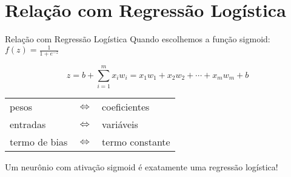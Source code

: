 \documentclass[xcolor=dvipsnames,t,aspectratio=169]{beamer}
\begin{document}
\section{Relação com Regressão Logística}
\begin{frame}[c]{Relação com Regressão Logística}
    Quando escolhemos a função sigmoid: $f(z) = \frac{1}{1 + e^{-z}}$
    
    \begin{equation}
        z = b + \sum_{i=1}^{m} x_i w_i = x_1w_1 + x_2w_2 + \cdots + x_mw_m + b
    \end{equation}
    
    \vspace{0.5cm}
    
    \begin{display}
        \begin{center}
            \begin{tabular}{lcl}
                pesos & $\Leftrightarrow$ & coeficientes \\
                entradas & $\Leftrightarrow$ & variáveis \\
                termo de bias & $\Leftrightarrow$ & termo constante
            \end{tabular}
        \end{center}
    \end{display}
    
    \begin{attention}
        Um neurônio com ativação sigmoid é exatamente uma regressão logística!
    \end{attention}
\end{frame}
\end{document}
